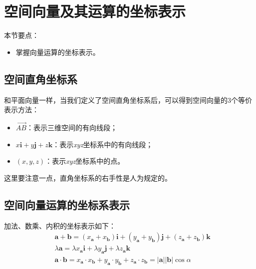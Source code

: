 \section{空间向量及其运算的坐标表示}

本节要点：
\begin{itemize}
    \item 掌握向量运算的坐标表示。
\end{itemize}

\subsection{空间直角坐标系}

和平面向量一样，当我们定义了空间直角坐标系后，可以得到空间向量的3个等价表示方法：
\begin{itemize}
    \item $\overrightarrow{AB}$：表示三维空间的有向线段；
    \item $x\boldsymbol{i}+y\boldsymbol{j}+z\boldsymbol{k}$：表示{\it xyz}坐标系中的有向线段；
    \item $\left( x,y,z \right) $：表示{\it xyz}坐标系中的点。
\end{itemize}

\begin{tcolorbox}
这里要注意一点，直角坐标系的右手性是人为规定的。
\end{tcolorbox}

\subsection{空间向量运算的坐标系表示}

加法、数乘、内积的坐标表示如下：
\begin{align*}
&\boldsymbol{a}+\boldsymbol{b}=\left( x_{\boldsymbol{a}}+x_{\boldsymbol{b}} \right) \boldsymbol{i}+\left( y_{\boldsymbol{a}}+y_{\boldsymbol{b}} \right) \boldsymbol{j}+\left( z_{\boldsymbol{a}}+z_{\boldsymbol{b}} \right) \boldsymbol{k} \\
&\lambda \boldsymbol{a}=\lambda x_{\boldsymbol{a}}\boldsymbol{i}+\lambda y_{\boldsymbol{a}}\boldsymbol{j}+\lambda z_{\boldsymbol{a}}\boldsymbol{k} \\
&\boldsymbol{a}\cdot \boldsymbol{b}=x_{\boldsymbol{a}}\cdot x_{\boldsymbol{b}}+y_{\boldsymbol{a}}\cdot y_{\boldsymbol{b}}+z_{\boldsymbol{a}}\cdot z_{\boldsymbol{b}}=\left| \boldsymbol{a} \right|\left| \boldsymbol{b} \right|\cos \alpha
\end{align*}

